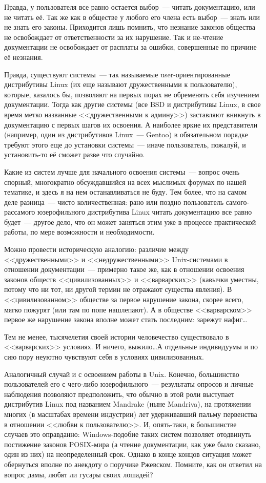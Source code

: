 Правда, у пользователя все равно остается выбор~--- читать документацию, или не читать её. Так же как в обществе у любого его члена есть выбор~--- знать или не знать его законы. Приходится лишь помнить, что незнание законов общества не освобождает от ответственности за их нарушение. Так и не-чтение документации не освобождает от расплаты за ошибки, совершенные по причине её незнания.

Правда, существуют системы~--- так называемые user-ориенти\-ро\-ван\-ные дистрибутивы Linux (их еще называют дружественными к пользователю), которые, казалось бы, позволяют на первых порах не обременять себя изучением документации. Тогда как другие системы (все BSD и дистрибутивы Linux, в свое время метко названные <<дружественными к админу>>) заставляют вникнуть в документацию с первых шагов их освоения. А наиболее яркие их представители (например, один из дистрибутивов Linux~--- Gentoo) в обязательном порядке требуют этого еще до установки системы~--- иначе пользователь, пожалуй, и установить-то её сможет разве что случайно.

Какие из систем лучше для начального освоения системы~--- вопрос очень спорный, многократно обсуждавшийся на всех мыслимых форумах по нашей тематике, и здесь я на нем останавливаться не буду. Тем более, что на самом деле разница~--- чисто количественная: рано или поздно пользователь самого-рассамого юзерофильного дистрибутива Linux читать документацию все равно будет~--- другое дело, что он может заняться этим уже в процессе практической работы, по мере возможности и необходимости.

Можно провести историческую аналогию: различие между <<дружественными>> и <<недружественными>> Unix-системами в отношении документации~--- примерно такое же, как в отношении освоения законов обществ <<цивилизованных>> и <<варварских>> (кавычки уместны, потому что ни тот, ни другой термин не отражают существа явления). В <<цивилизованном>> обществе за первое нарушение закона, скорее всего, мягко пожурят (или там по попе нашлепают). А в обществе <<варварском>> первое же нарушение закона вполне может стать последним: зарежут нафиг\dots

Тем не менее, тысячелетия своей истории человечество существовало в <<варварских>> условиях. И ничего, выжило\dots А отдельные индивидуумы и по сию пору неуютно чувствуют себя в условиях цивилизованных.

Аналогичный случай и с освоением работы в Unix. Конечно, большинство пользователей его с чего-либо юзерофильного~--- результаты опросов и личные наблюдения позволяют предположить, что обычно в этой роли выступает дистрибутив Linux под названием Mandrake (ныне Mandriva), на протяжении многих (в масштабах времени индустрии) лет удерживавший пальму первенства в отношении <<любви к пользователю>>. И, опять-таки, в большинстве случаев это оправданно: Windows-подобие таких систем позволяет отодвинуть постижение законов POSIX-мира (а чтение документации, как уже было сказано, один из них) на неопределенный срок. Однако в конце концов ситуация может обернуться вполне по анекдоту о поручике Ржевском. Помните, как он ответил на вопрос дамы, любят ли гусары своих лошадей?

